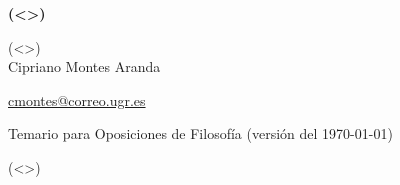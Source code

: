 \documentclass[12pt]{article}
\begin{document}
\begin{titlepage}
        \begin{center}
                \vspace*{0.5cm}

                \Huge
		\textbf{(<>)}

                \vspace{0.5cm}
                \Large
		(<>)\\
                \vspace{2.5cm}
                Cipriano Montes Aranda


                \large
                \href{mailto:cmontes@correo.ugr.es}{cmontes@correo.ugr.es}

                \large
                \vfill

                \vspace{0.5cm}
		Temario para Oposiciones de Filosofía
		\normalsize(versión del \today)\\
        \end{center}
\end{titlepage}

\pagestyle{empty}

\onehalfspace

\tableofcontents

\newpage

\normalsize

\pagestyle{fancy}

(<>)

\newpage

\printbibliography
\end{document}
